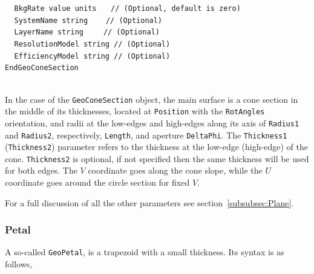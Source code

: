 $~~~~~${\tt BkgRate          value units                       $~~~$   // (Optional, default is zero)} \\
$~~~~~${\tt SystemName       string                          $~~~~~$   // (Optional)} \\
$~~~~~${\tt LayerName        string                         $~~~~~~$   // (Optional)} \\
$~~~~~${\tt ResolutionModel  string                                    // (Optional)} \\
$~~~~~${\tt EfficiencyModel  string                                    // (Optional)} \\
{\tt EndGeoConeSection}

~\\
In the case of the {\tt GeoConeSection} object, the main surface is a cone section in the middle of its thicknesses, located at {\tt Position} with the {\tt RotAngles}
orientation, and radii at the low-edges and high-edges along its axis of {\tt Radius1} and {\tt Radius2}, respectively, {\tt Length}, and aperture {\tt DeltaPhi}. The 
{\tt Thickness1} ({\tt Thickness2}) parameter refers to the thickness at the low-edge (high-edge) of the cone. {\tt Thickness2} is optional, if not specified then the 
same thickness will be used for both edges. The $V$ coordinate goes along the cone slope, while the $U$ coordinate goes around the circle section for fixed $V$.

For a full discussion of all the other parameters see section~\ref{subsubsec:Plane}.

\subsubsection{Petal}

A so-called {\tt GeoPetal}, is a trapezoid with a small thickness. Its syntax is as follows,

